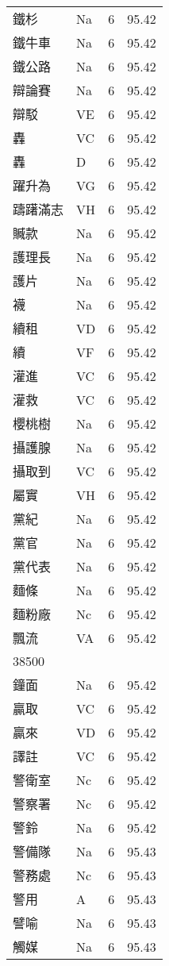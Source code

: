 \documentclass[twocolumn]{book}
\begin{document}
\begin{supertabular}{llrr}
鐵杉 & Na & 6 &  95.42\\
鐵牛車 & Na & 6 &  95.42\\
鐵公路 & Na & 6 &  95.42\\
辯論賽 & Na & 6 &  95.42\\
辯駁 & VE & 6 &  95.42\\
轟 & VC & 6 &  95.42\\
轟 & D & 6 &  95.42\\
躍升為 & VG & 6 &  95.42\\
躊躇滿志 & VH & 6 &  95.42\\
贓款 & Na & 6 &  95.42\\
護理長 & Na & 6 &  95.42\\
護片 & Na & 6 &  95.42\\
襪 & Na & 6 &  95.42\\
續租 & VD & 6 &  95.42\\
續 & VF & 6 &  95.42\\
灌進 & VC & 6 &  95.42\\
灌救 & VC & 6 &  95.42\\
櫻桃樹 & Na & 6 &  95.42\\
攝護腺 & Na & 6 &  95.42\\
攝取到 & VC & 6 &  95.42\\
屬實 & VH & 6 &  95.42\\
黨紀 & Na & 6 &  95.42\\
黨官 & Na & 6 &  95.42\\
黨代表 & Na & 6 &  95.42\\
麵條 & Na & 6 &  95.42\\
麵粉廠 & Nc & 6 &  95.42\\
飄流 & VA & 6 &  95.42\\
38500\\
鐘面 & Na & 6 &  95.42\\
贏取 & VC & 6 &  95.42\\
贏來 & VD & 6 &  95.42\\
譯註 & VC & 6 &  95.42\\
警衛室 & Nc & 6 &  95.42\\
警察署 & Nc & 6 &  95.42\\
警鈴 & Na & 6 &  95.42\\
警備隊 & Na & 6 &  95.43\\
警務處 & Nc & 6 &  95.43\\
警用 & A & 6 &  95.43\\
譬喻 & Na & 6 &  95.43\\
觸媒 & Na & 6 &  95.43\\

\end{supertabular}
\end{document}
